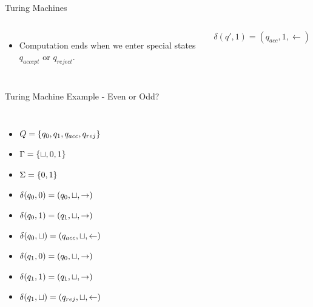 \documentclass[c]{beamer}
\begin{document}
\begin{frame}{Turing Machines}
  \begin{columns}

    \begin{itemize}
    \item Computation ends when we enter special states $q_{accept}$
      or $q_{reject}$.
    \end{itemize}
    $$\delta(q', 1) = (q_{acc}, 1, \leftarrow)$$
  \end{columns}
\end{frame}

\begin{frame}{Turing Machine Example - Even or Odd?}
  \begin{columns}[c]
    
    \small


    \begin{itemize}
    \item[] $Q = \{q_0, q_1, q_{acc}, q_{rej}\}$
    \item[] $\Gamma = \{\sqcup, 0, 1\}$
    \item[] $\Sigma = \{0,1\}$
    \item[] $\delta(q_0, 0) = (q_0, \sqcup, \rightarrow)$
    \item[] $\delta(q_0, 1) = (q_1, \sqcup, \rightarrow)$
    \item[] $\delta(q_0, \sqcup) = (q_{acc}, \sqcup, \leftarrow)$
    \item[] $\delta(q_1, 0) = (q_0, \sqcup, \rightarrow)$
    \item[] $\delta(q_1, 1) = (q_1, \sqcup, \rightarrow)$
    \item[] $\delta(q_1, \sqcup) = (q_{rej}, \sqcup, \leftarrow)$
    \end{itemize}

    
      
  \end{columns}
\end{frame}
\end{document}
